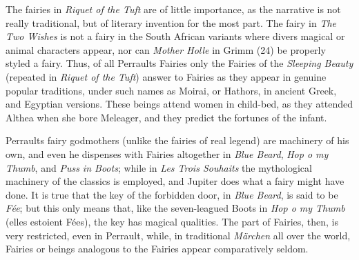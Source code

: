 \documentclass[14pt,a4paper]{memoir}
\begin{document}
The fairies in \emph{Riquet of the Tuft} are of little importance, as
the narrative is not really traditional, but of literary invention for
the most part. The fairy in \emph{The Two Wishes} is not a fairy in the
South African variants where divers magical or animal characters appear,
nor can \emph{Mother Holle} in Grimm (24) be properly styled a fairy.
Thus, of all Perrault\textquotesingle s Fairies only the Fairies of the
\emph{Sleeping Beauty} (repeated in \emph{Riquet of the Tuft}) answer to
Fairies as they appear in genuine popular traditions, under such names
as Moirai, or Hathors, in ancient Greek, and Egyptian versions. These
beings attend women in child-bed, as they attended Althea when she bore
Meleager, and they predict the fortunes of the infant.

Perrault\textquotesingle s fairy godmothers (unlike the fairies of real
legend) are machinery of his own, and even he dispenses with Fairies
altogether in \emph{Blue Beard}, \emph{Hop o\textquotesingle{} my
Thumb}, and \emph{Puss in Boots}; while in \emph{Les Trois Souhaits} the
mythological machinery of the classics is employed, and Jupiter does
what a fairy might have done. It is true that the key of the forbidden
door, in \emph{Blue Beard}, is said to be \emph{Fée}; but this only
means that, like the seven-leagued Boots in \emph{Hop
o\textquotesingle{} my Thumb} (\textquotesingle elles estoient
Fées\textquotesingle), the key has magical qualities. The part of
Fairies, then, is very restricted, even in Perrault, while, in
traditional \emph{Märchen} all over the world, Fairies or beings
analogous to the Fairies appear comparatively seldom.
\end{document}

